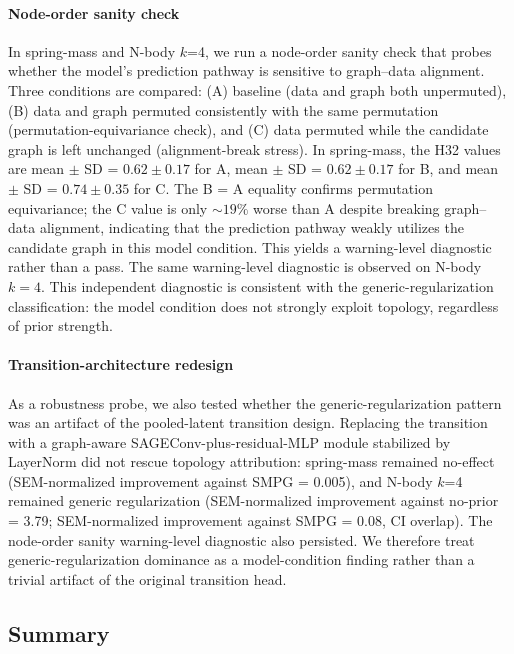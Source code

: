 \documentclass[preprint,12pt]{elsarticle}
\begin{document}
\paragraph{Node-order sanity check}
In spring-mass and N-body $k$=4, we run a node-order sanity check 
that probes whether the model's prediction pathway is sensitive to 
graph--data alignment. Three conditions are compared: (A) baseline 
(data and graph both unpermuted), (B) data and graph permuted 
consistently with the same permutation (permutation-equivariance 
check), and (C) data permuted while the candidate graph is left 
unchanged (alignment-break stress). In spring-mass, the H32 values 
are mean \(\pm\) SD = \(0.62 \pm 0.17\) for A, mean \(\pm\) SD = \(0.62 \pm 0.17\) for B, and mean \(\pm\) SD = \(0.74 \pm 0.35\) for C. The B = A 
equality confirms permutation equivariance; the C value is only 
$\sim 19\%$ worse than A despite breaking graph--data alignment, 
indicating that the prediction pathway weakly utilizes the candidate 
graph in this model condition. This yields a warning-level diagnostic rather than a pass. The same 
warning-level diagnostic is observed on N-body \(k=4\). This independent diagnostic is 
consistent with the generic-regularization classification: the model 
condition does not strongly exploit topology, regardless of prior 
strength.

\paragraph{Transition-architecture redesign}
\label{sec:transition-control}
As a robustness probe, we also tested whether the 
generic-regularization pattern was an artifact of the pooled-latent 
transition design. Replacing the transition with a graph-aware 
SAGEConv-plus-residual-MLP module stabilized by LayerNorm did not 
rescue topology attribution: spring-mass remained no-effect (SEM-normalized improvement 
against SMPG = 0.005), and N-body $k$=4 remained generic 
regularization (SEM-normalized improvement against no-prior = 3.79; SEM-normalized improvement against SMPG 
= 0.08, CI overlap). The node-order sanity warning-level diagnostic also persisted. 
We therefore treat generic-regularization dominance as a 
model-condition finding rather than a trivial artifact of the 
original transition head.

\subsection{Summary}
\label{sec:results-summary}
\end{document}
